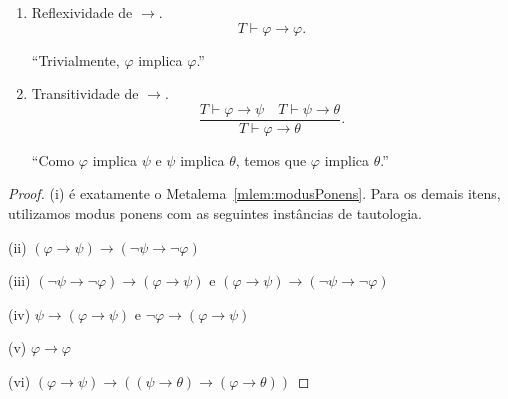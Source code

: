 \begin{metaproposition}
\begin{enumerate}[label=(\roman*)]
        ``Como vale $\psi$, $\varphi$ implica $\psi$ independentemente de $\varphi$.''

        ``Como vale $\neg\varphi$, $\varphi$ implica $\psi$ trivialmente.''


        \item Reflexividade de $\rightarrow$.
        \[
            T\vdash \varphi\rightarrow\varphi.
        \]

        ``Trivialmente, $\varphi$ implica $\varphi$.''

        \item Transitividade de $\rightarrow$.
        \[
            \frac{T\vdash \varphi\rightarrow\psi \quad T\vdash \psi\rightarrow\theta}
                 {T\vdash \varphi\rightarrow\theta}.
        \]

        ``Como $\varphi$ implica $\psi$ e $\psi$ implica $\theta$, temos que $\varphi$ implica $\theta$.''
    \end{enumerate}
\end{metaproposition}

\begin{proof}
    (i) é exatamente o Metalema~\ref{mlem:modusPonens}.
    Para os demais itens, utilizamos modus ponens com as seguintes instâncias de tautologia.

    (ii) $(\varphi\rightarrow\psi)\rightarrow(\neg\psi\rightarrow\neg\varphi)$

    (iii) $(\neg\psi\rightarrow\neg\varphi)\rightarrow(\varphi\rightarrow\psi)$ e $(\varphi\rightarrow\psi)\rightarrow(\neg\psi\rightarrow\neg\varphi)$

    (iv) $\psi\rightarrow(\varphi\rightarrow\psi)$ e $\neg\varphi\rightarrow(\varphi\rightarrow\psi)$

    (v) $\varphi\rightarrow\varphi$

    (vi) $(\varphi\rightarrow\psi)\rightarrow((\psi\rightarrow\theta)\rightarrow(\varphi\rightarrow\theta))$
\end{proof}

